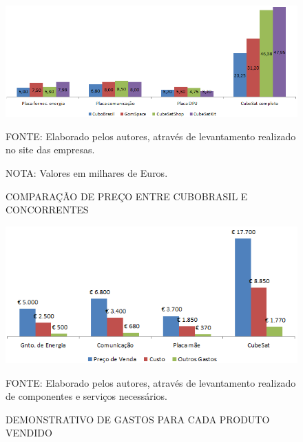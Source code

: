\documentclass[
	12pt,				%
	openright,			%
	oneside,			%
	a4paper,			%
	english,			%
	french,				%
	spanish,			%
	brazil				%
	]{abntex2}
\begin{document}
	 \begin{figure}[th]
		\caption{COMPARAÇÃO DE PREÇO ENTRE CUBOBRASIL E CONCORRENTES}
		\centering
		\includegraphics[width=1.0\linewidth]{./figs/Grafico_01}
		
		\begin{small}
			FONTE: Elaborado pelos autores, através de levantamento realizado no site das empresas.
		\end{small}
		
		\begin{footnotesize}
			NOTA: Valores em milhares de Euros.
		\end{footnotesize}
	\end{figure}
	\pagebreak
	\begin{figure}[th]
		\caption{DEMONSTRATIVO DE GASTOS PARA CADA PRODUTO VENDIDO}
		\centering
		\includegraphics[width=1.0\linewidth]{./figs/Figura_05}
		
		\begin{small}
			FONTE: Elaborado pelos autores, através de levantamento realizado de componentes e serviços necessários.
		\end{small}
	\end{figure}
	
\end{document}

